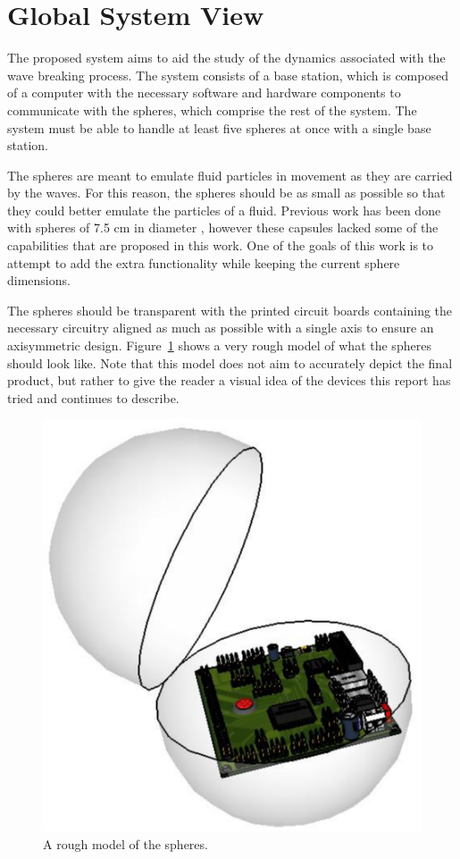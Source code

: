 \section{Global System View}

The proposed system aims to aid the study of the dynamics associated with the wave breaking process.  The system consists of a base station, which is composed of a computer with the necessary software and hardware components to communicate with the spheres, which comprise the rest of the system.  The system must be able to handle at least five spheres at once with a single base station.

The spheres are meant to emulate fluid particles in movement as they are carried by the waves.  For this reason, the spheres should be as small as possible so that they could better emulate the particles of a fluid.  Previous work has been done with spheres of 7.5 cm in diameter \cite{Canals2012}, however these capsules lacked some of the capabilities that are proposed in this work.  One of the goals of this work is to attempt to add the extra functionality while keeping the current sphere dimensions.

The spheres should be transparent with the printed circuit boards containing the necessary circuitry aligned as much as possible with a single axis to ensure an axisymmetric design.  Figure~\ref{fig:sphereMockup} shows a very rough model of what the spheres should look like.  Note that this model does not aim to accurately depict the final product, but rather to give the reader a visual idea of the devices this report has tried and continues to describe.  

\begin{figure}[H]
	\centering
	\includegraphics[scale=0.6]{img/Sphere_001}
	\caption{A rough model of the spheres. \label{fig:sphereMockup}}
\end{figure}

